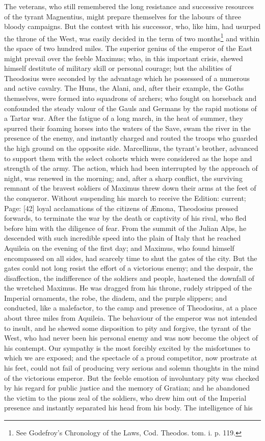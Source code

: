 The veterans, who still remembered the long resistance and successive resources of the tyrant Magnentius, might prepare themselves for the labours of three bloody campaigns. But the contest with his successor, who, like him, had usurped the throne of the West, was easily decided in the term of two months\footnote{See Godefroy\texthebrew{}’s Chronology of the Laws, Cod. Theodos. tom. i. p. 119.} and within the space of two hundred miles. The superior genius of the emperor of the East might prevail over the feeble Maximus; who, in this important crisis, shewed himself destitute of military skill or personal courage; but the abilities of Theodosius were seconded by the advantage which he possessed of a numerous and active cavalry. The Huns, the Alani, and, after their example, the Goths themselves, were formed into squadrons of archers; who fought on horseback and confounded the steady valour of the Gauls and Germans by the rapid motions of a Tartar war. After the fatigue of a long march, in the heat of summer, they spurred their foaming horses into the waters of the Save, swam the river in the presence of the enemy, and instantly charged and routed the troops who guarded the high ground on the opposite side. Marcellinus, the tyrant\texthebrew{}’s brother, advanced to support them with the select cohorts which were considered as the hope and strength of the army. The action, which had been interrupted by the approach of night, was renewed in the morning; and, after a sharp conflict, the surviving remnant of the bravest soldiers of Maximus threw down their arms at the feet of the conqueror. Without suspending his march to receive the Edition: current; Page: [42] loyal acclamations of the citizens of Æmona, Theodosius pressed forwards, to terminate the war by the death or captivity of his rival, who fled before him with the diligence of fear. From the summit of the Julian Alps, he descended with such incredible speed into the plain of Italy that he reached Aquileia on the evening of the first day; and Maximus, who found himself encompassed on all sides, had scarcely time to shut the gates of the city. But the gates could not long resist the effort of a victorious enemy; and the despair, the disaffection, the indifference of the soldiers and people, hastened the downfall of the wretched Maximus. He was dragged from his throne, rudely stripped of the Imperial ornaments, the robe, the diadem, and the purple slippers; and conducted, like a malefactor, to the camp and presence of Theodosius, at a place about three miles from Aquileia. The behaviour of the emperor was not intended to insult, and he shewed some disposition to pity and forgive, the tyrant of the West, who had never been his personal enemy and was now become the object of his contempt. Our sympathy is the most forcibly excited by the misfortunes to which we are exposed; and the spectacle of a proud competitor, now prostrate at his feet, could not fail of producing very serious and solemn thoughts in the mind of the victorious emperor. But the feeble emotion of involuntary pity was checked by his regard for public justice and the memory of Gratian; and he abandoned the victim to the pious zeal of the soldiers, who drew him out of the Imperial presence and instantly separated his head from his body. The intelligence of his 